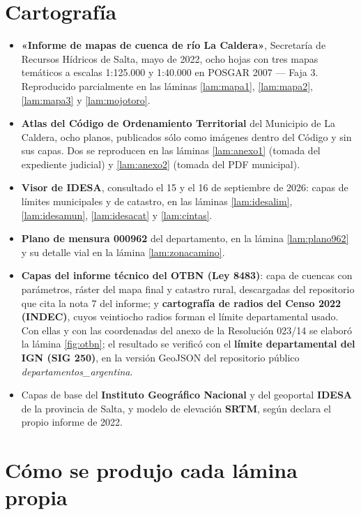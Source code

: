 \section{Cartografía}

\begin{itemize}[leftmargin=*]
\item \textbf{«Informe de mapas de cuenca de río La Caldera»}, Secretaría de Recursos
Hídricos de Salta, mayo de 2022, ocho hojas con tres mapas temáticos a escalas 1:125.000 y
1:40.000 en POSGAR 2007 --- Faja 3. Reproducido parcialmente en las láminas
\ref{lam:mapa1}, \ref{lam:mapa2}, \ref{lam:mapa3} y \ref{lam:mojotoro}.
\item \textbf{Atlas del Código de Ordenamiento Territorial} del Municipio de La Caldera,
ocho planos, publicados sólo como imágenes dentro del Código y sin sus capas. Dos se reproducen en las láminas \ref{lam:anexo1} (tomada del expediente judicial) y \ref{lam:anexo2} (tomada del PDF municipal).
\item \textbf{Visor de IDESA}, consultado el 15 y el 16 de septiembre de 2026: capas de límites municipales y de catastro, en las láminas \ref{lam:idesalim}, \ref{lam:idesamun}, \ref{lam:idesacat} y \ref{lam:cintas}.
\item \textbf{Plano de mensura 000962} del departamento, en la lámina \ref{lam:plano962} y su detalle vial en la lámina \ref{lam:zonacamino}.
\item \textbf{Capas del informe técnico del OTBN (Ley 8483)}: capa de cuencas con parámetros, ráster del mapa final y catastro rural, descargadas del repositorio que cita la nota 7 del informe; y \textbf{cartografía de radios del Censo 2022 (INDEC)}, cuyos veintiocho radios forman el límite departamental usado. Con ellas y con las coordenadas del anexo de la Resolución 023/14 se elaboró la lámina \ref{fig:otbn}; el resultado se verificó con el \textbf{límite departamental del IGN (SIG 250)}, en la versión GeoJSON del repositorio público \textit{departamentos\_argentina}.
\item Capas de base del \textbf{Instituto Geográfico Nacional} y del geoportal
\textbf{IDESA} de la provincia de Salta, y modelo de elevación \textbf{SRTM}, según declara
el propio informe de 2022.
\end{itemize}

\section{Cómo se produjo cada lámina propia}


